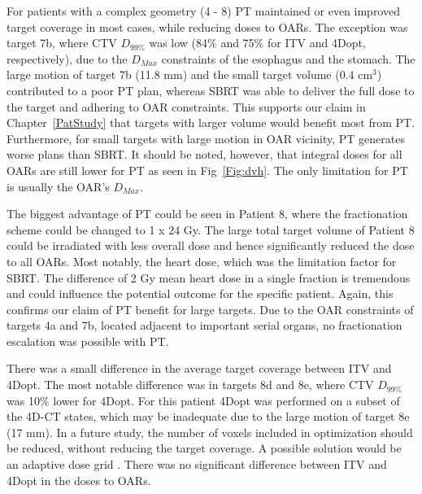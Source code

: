 For patients with a complex geometry (4 - 8) PT maintained or even improved target coverage in most cases, while reducing doses to OARs.
The exception was target 7b, where CTV $D_{99\%}$ was low (84\% and 75\% for ITV and 4Dopt, respectively), due to the $D_{Max}$ constraints of the esophagus and the stomach.
The large motion of target 7b (11.8 mm) and the small target volume (0.4 cm$^3$) contributed to a poor PT plan, whereas SBRT was able to deliver the full dose to the target
and adhering to OAR constraints. This supports our claim in Chapter~\ref{PatStudy} that targets with larger volume would benefit most from PT. Furthermore, for small targets
with large motion in OAR vicinity, PT generates worse plans than SBRT. It should be noted, however, that integral doses for all OARs are still lower for PT as seen in Fig~\ref{Fig:dvh}.
The only limitation for PT is usually the OAR's $D_{Max}$.

The biggest advantage of PT could be seen in Patient 8, where the fractionation scheme could be changed to 1 x 24 Gy. 
The large total target volume of Patient 8 could be irradiated with less overall dose and hence significantly reduced the dose to all OARs. Most notably, the heart dose,
which was the limitation factor for SBRT. The difference of 2 Gy mean heart dose in a single fraction is tremendous and could influence the potential outcome for the specific patient.
Again, this confirms our claim of PT benefit for large targets.
Due to the OAR constraints of targets 4a and 7b, located adjacent to important serial organs, no fractionation escalation was possible with PT. 

There was a small difference in the average target coverage between ITV and 4Dopt. The most notable difference was in targets 8d and 8e, where CTV $D_{99\%}$ was 10\% lower
for 4Dopt. For this patient 4Dopt was performed on a subset of the  4D-CT states, which may be inadequate due to the large motion of target 8e (17 mm). In a future study,
the number of voxels included in optimization should be reduced, without reducing the target coverage. A possible solution would be an adaptive dose grid \cite{Prall2016a}.
There was no significant difference between ITV and 4Dopt in the doses to OARs. 


